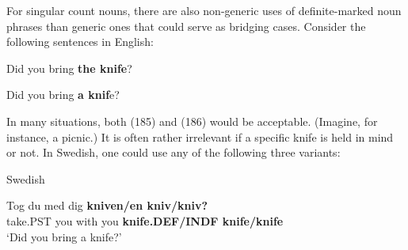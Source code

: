 
For singular count nouns, there are also non-generic uses of definite-marked noun phrases than generic ones that could serve as bridging cases. Consider the following sentences in English:


\item 

\label{bkm:Ref123724733}Did you bring \textbf{the knife}?

\item 

\label{bkm:Ref123724734}Did you bring \textbf{a knif}e?



In many situations, both (185) and (186) would be acceptable. (Imagine, for instance, a picnic.) It is often rather irrelevant if a specific knife is held in mind or not. In Swedish, one could use any of the following three variants:


\item 

Swedish



 \ea\label{}
\gll Tog  du  med  dig  \textbf{kniven/en kniv/kniv?}\\


take.PST  you  with  you  \textbf{knife.DEF/INDF knife/knife}\\

\glt ‘Did you bring a knife?’

